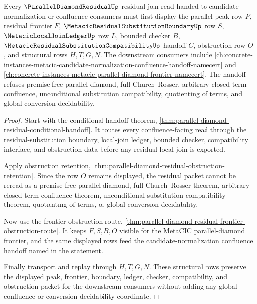 \begin{theorem}
\label{thm:parallel-diamond-residual-normalization-frontier-handoff}
Every $\ParallelDiamondResidualUp$ residual-join read handed to candidate-normalization or confluence consumers must first display the parallel peak row $P$, residual frontier $F$, $\MetacicResidualSubstitutionBoundaryUp$ row $S$, $\MetacicLocalJoinLedgerUp$ row $L$, bounded checker $B$, $\MetacicResidualSubstitutionCompatibilityUp$ handoff $C$, obstruction row $O$, and structural rows $H,T,G,N$. The downstream consumers include \autoref{ch:concrete-instances-metacic-candidate-normalization-confluence-handoff-namecert} and \autoref{ch:concrete-instances-metacic-parallel-diamond-frontier-namecert}. The handoff refuses premise-free parallel diamond, full Church--Rosser, arbitrary closed-term confluence, unconditional substitution compatibility, quotienting of terms, and global conversion decidability.
\end{theorem}
\begin{proof}
Start with the conditional handoff theorem, \autoref{thm:parallel-diamond-residual-conditional-handoff}. It routes every confluence-facing read through the residual-substitution boundary, local-join ledger, bounded checker, compatibility interface, and obstruction data before any residual local join is exported.

Apply obstruction retention, \autoref{thm:parallel-diamond-residual-obstruction-retention}. Since the row $O$ remains displayed, the residual packet cannot be reread as a premise-free parallel diamond, full Church--Rosser theorem, arbitrary closed-term confluence theorem, unconditional substitution-compatibility theorem, quotienting of terms, or global conversion decidability.

Now use the frontier obstruction route, \autoref{thm:parallel-diamond-residual-frontier-obstruction-route}. It keeps $F,S,B,O$ visible for the MetaCIC parallel-diamond frontier, and the same displayed rows feed the candidate-normalization confluence handoff named in the statement.

Finally transport and replay through $H,T,G,N$. These structural rows preserve the displayed peak, frontier, boundary, ledger, checker, compatibility, and obstruction packet for the downstream consumers without adding any global confluence or conversion-decidability coordinate.
\end{proof}


